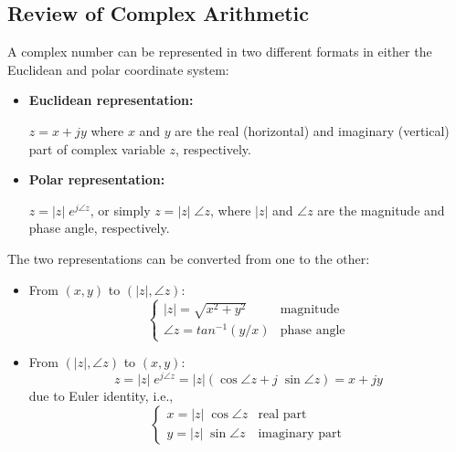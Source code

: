 \subsection*{Review of Complex Arithmetic} 

A complex number can be represented in two different formats in either
the Euclidean and polar coordinate system:
\begin{itemize}
\item {\bf Euclidean representation:} 

  $z=x+jy$ where $x$ and $y$ are the real (horizontal) and imaginary 
  (vertical) part of complex variable $z$, respectively.
\item {\bf Polar representation:} 

  $z = |z|\;e^{j\angle z}$, or simply $z=|z|\;\angle z$, where $|z|$ and
  $\angle z$ are the magnitude and phase angle, respectively.
\end{itemize}


The two representations can be converted from one to the other:
\begin{itemize}
\item From $(x,y)$ to $(|z|,\angle z)$:
  \[
  \left\{ \begin{array}{ll} |z|=\sqrt{x^2+y^2} & \mbox{magnitude}\\
    \angle z=tan^{-1} (y/x) & \mbox{phase angle}
  \end{array} \right. 
  \]
\item From $(|z|,\angle z)$ to $(x,y)$:
  \[ 
  z=|z|\;e^{j\angle z}=|z|(\cos\angle z+j\;\sin\angle z)=x+jy 
  \]
  due to Euler identity, i.e.,
  \[
  \left\{ \begin{array}{ll} x=|z|\;\cos\angle z & \mbox{real part}\\
    y=|z|\;\sin\angle z & \mbox{imaginary part}
  \end{array} \right. 
  \]
\end{itemize}

